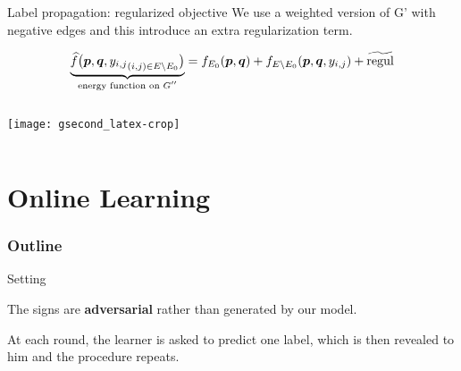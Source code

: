 \documentclass[10pt,svgnames,ignorenonframetext,final]{beamer}
\begin{document}
\begin{frame}{Label propagation: regularized objective}
  We use a weighted version of G' with negative edges and this introduce an extra regularization
  term.


  \vspace{-5mm}
\begin{equation*}
  \underbrace{ \widehat{f}\big(\boldsymbol{p},\boldsymbol{q},{y_{i,j}}_{(i,j) \in E\setminus E_0}\big)}_{\text{energy
  function on $G''$}} =
  f_{E_0}(\boldsymbol{p},\boldsymbol{q}) + f_{E\setminus E_0}(\boldsymbol{p},\boldsymbol{q}, {y_{i,j}}) + \widetilde{\mathrm{regul}}
\end{equation*}

\begin{columns}
\begin{column}{0.6\textwidth}
  \begin{center}
  \vspace{-5mm}
   \texttt{[image: gsecond\_latex-crop]}
  \end{center}
\end{column}
\begin{column}{0.4\textwidth}  %
\end{column}
\end{columns}
\end{frame}

\section{Online Learning}\label{online-learning}
  \begin{frame} \frametitle{Outline} \tableofcontents[currentsection] \end{frame}

\begin{frame}{Setting}

The signs are \textbf{adversarial} rather than generated by our model.

At each round, the learner is asked to predict one label, which is then revealed to him and the
procedure repeats.

\end{frame}
\end{document}
